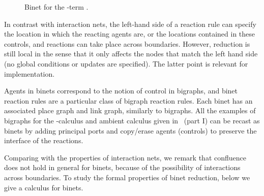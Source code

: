 \documentclass[copyright,creativecommons]{eptcs}
\begin{document}
\begin{figure}
\begin{center}
\end{center}
\caption{Binet for the -term .}
\label{fig:binet-ex}
\end{figure}


In contrast with interaction nets, the left-hand side of a reaction
rule can specify the location in which the reacting agents are, or
the locations contained in these controls, and reactions can take
place across boundaries.  However, reduction is still local in the
sense that it only affects the nodes that match the left hand side (no
global conditions or updates are specified).  The latter point is
relevant for implementation.  

Agents in binets correspond to the
notion of control in bigraphs, and binet reaction rules are a particular
class of bigraph reaction rules. Each binet 
has an associated place graph and link graph, similarly to bigraphs.
All the examples of bigraphs for the -calculus and
ambient calculus given in~\cite{jensen03bigraphs} (part I) can be
recast as binets by adding principal ports and copy/erase agents (controls)
to preserve the interface of the reactions.


Comparing with the properties of interaction nets, we remark that
confluence does not hold in general for binets, because of the
possibility of interactions across boundaries. 
To study the formal properties of binet reduction, below we give a 
calculus for binets.
\end{document}
